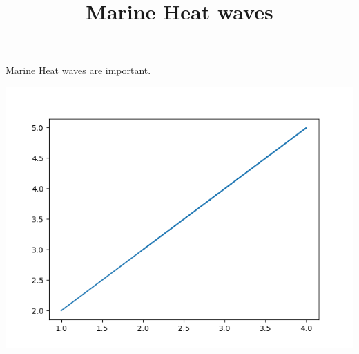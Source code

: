 \documentclass[]{article}
\title{Marine Heat waves}
\begin{document}
\maketitle

Marine Heat waves are important.

\includegraphics{myplot}
\end{document}

